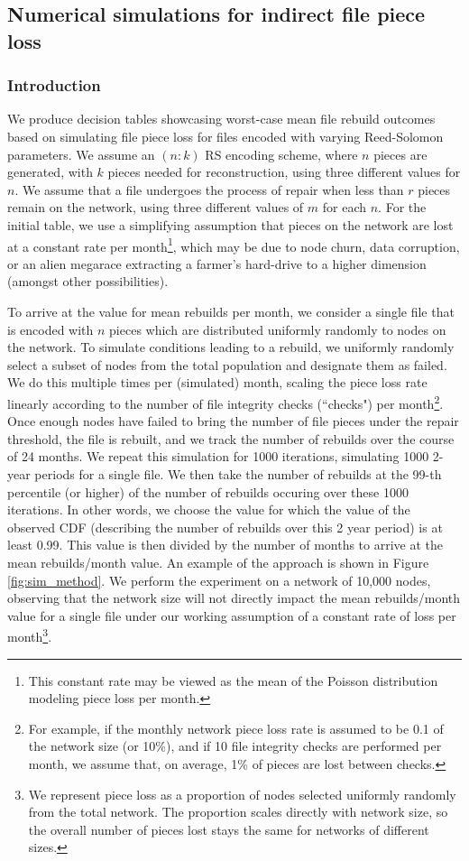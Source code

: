 
\subsection{Numerical simulations for indirect file piece loss}
\subsubsection{Introduction}
We produce decision tables showcasing worst-case mean file rebuild outcomes based on simulating file piece loss for files encoded with varying Reed-Solomon parameters. 
We assume an $(n:k)$ RS encoding scheme, where $n$ pieces are generated, with $k$ pieces needed for reconstruction, using three different values for $n$.
We assume that a file undergoes the process of repair when less than $r$ pieces remain on the network, using three different values of $m$ for each $n$.
For the initial table, we use a simplifying assumption that pieces on the network are lost at a constant rate per month\footnote{This constant rate may be viewed as the mean of the Poisson distribution modeling piece loss per month.}, which may be due to node churn, data corruption, or an alien megarace extracting a farmer's hard-drive to a higher dimension (amongst other possibilities).


To arrive at the value for mean rebuilds per month, we consider a single file that is encoded with $n$ pieces which are distributed uniformly randomly to nodes on the network. To simulate conditions leading to a rebuild, we uniformly randomly select a subset of nodes from the total population and designate them as failed. We do this multiple times per (simulated) month, scaling the piece loss rate linearly according to the number of file integrity checks (``checks") per month\footnote{
For example, if the monthly network piece loss rate is assumed to be 0.1 of the network size (or 10\%), and if 10 file integrity checks are performed per month, we assume that, on average, 1\% of pieces are lost between checks.}. 
Once enough nodes have failed to bring the number of file pieces under the repair threshold, the file is rebuilt, and we track the number of rebuilds over the course of 24 months.
We repeat this simulation for 1000 iterations, simulating 1000 2-year periods for a single file. We then take the number of rebuilds at the 99-th percentile (or higher) of the number of rebuilds occuring over these 1000 iterations. In other words, we choose the value for which the value of the observed CDF (describing the number of rebuilds over this 2 year period) is at least 0.99. This value is then divided by the number of months to arrive at the mean rebuilds/month value. An example of the approach is shown in Figure \ref{fig:sim_method}. We perform the experiment on a network of 10,000 nodes, observing that the network size will not directly impact the mean rebuilds/month value for a single file under our working assumption of a constant rate of loss per month\footnote{We represent piece loss as a proportion of nodes selected uniformly randomly from the total network. The proportion scales directly with network size, so the overall number of pieces lost stays the same for networks of different sizes.}.

